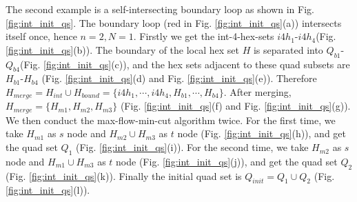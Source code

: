\documentclass[final,5p,times,twocolumn]{elsarticle}
\begin{document}
The second example is a self-intersecting boundary loop as shown in Fig. \ref{fig:int_init_qs}. The boundary loop (red in Fig. \ref{fig:int_init_qs}(a)) intersects itself once, hence $n=2,N=1$. Firstly we get the int-4-hex-sets $i4h_1$-$i4h_4$(Fig. \ref{fig:int_init_qs}(b)). The boundary of the local hex set $H$ is separated into $Q_{b1}$-$Q_{b4}$(Fig. \ref{fig:int_init_qs}(c)), and the hex sets adjacent to these quad subsets are $H_{b1}$-$H_{b4}$ (Fig. \ref{fig:int_init_qs}(d) and Fig. \ref{fig:int_init_qs}(e)). Therefore $H_{merge}=H_{int} \cup H_{bound}=\{i4h_1,\cdots,i4h_4,H_{b1},\cdots,H_{b4}\}$. After merging, $H_{merge}=\{H_{m1},H_{m2},H_{m3}\}$ (Fig. \ref{fig:int_init_qs}(f) and Fig. \ref{fig:int_init_qs}(g)). We then conduct the max-flow-min-cut algorithm twice. For the first time, we take $H_{m1}$ as $s$ node and $H_{m2} \cup H_{m3}$ as $t$ node (Fig. \ref{fig:int_init_qs}(h)), and get the quad set $Q_1$ (Fig. \ref{fig:int_init_qs}(i)). For the second time, we take $H_{m2}$ as $s$ node and $H_{m1} \cup H_{m3}$ as $t$ node (Fig. \ref{fig:int_init_qs}(j)), and get the quad set $Q_2$ (Fig. \ref{fig:int_init_qs}(k)). Finally the initial quad set is $Q_{init}=Q_1 \cup Q_2$ (Fig. \ref{fig:int_init_qs}(l)).
\end{document}
